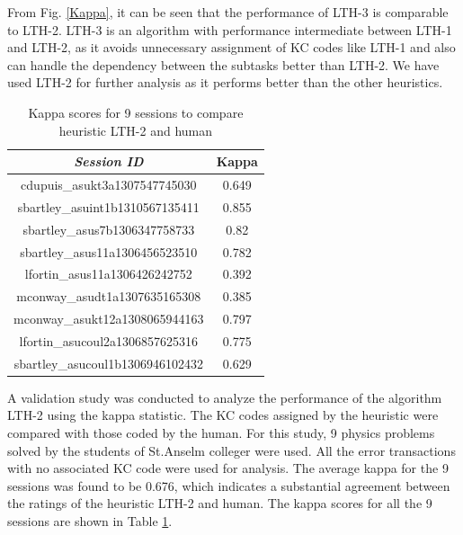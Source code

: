 \documentclass[conference]{IEEEtran}
\begin{document}
From Fig. \ref{Kappa}, it can be seen that the performance of LTH-3 is comparable to LTH-2. LTH-3 is an algorithm with performance intermediate between LTH-1 and LTH-2, as it avoids unnecessary assignment of KC codes like LTH-1 and also can handle the dependency between the subtasks better than LTH-2. We have used LTH-2 for further analysis as it performs better than the other heuristics.

\begin{table}
\caption{Kappa scores for 9 sessions to compare heuristic LTH-2 and human}
\centering
\label{Best}
\begin{tabular}{|c|c|}

\hline
{\it {\bf Session ID }} & Kappa \\
\hline
      cdupuis\_asukt3a1307547745030  &       0.649   \\

      sbartley\_asuint1b1310567135411  &        0.855 \\

      sbartley\_asus7b1306347758733 &       0.82  \\

     sbartley\_asus11a1306456523510 &      0.782  \\

    lfortin\_asus11a1306426242752 &      0.392 \\

    mconway\_asudt1a1307635165308 &    0.385 \\

    mconway\_asukt12a1308065944163&    0.797 \\

     lfortin\_asucoul2a1306857625316 &   0.775 \\

sbartley\_asucoul1b1306946102432  &       0.629   \\
\hline
\end{tabular}
\end{table}


A validation study was conducted to analyze the performance of the algorithm LTH-2 using the kappa statistic. The KC codes assigned by the heuristic were compared with those coded by the human. For this study, 9 physics problems solved by the students of St.Anselm colleger were used. All the error transactions with no associated KC code were used for analysis. The average kappa for the 9 sessions was found to be 0.676, which indicates a substantial agreement between the ratings of the heuristic LTH-2 and human. The kappa scores for all the 9 sessions are shown in Table \ref{Best}.
\end{document}
